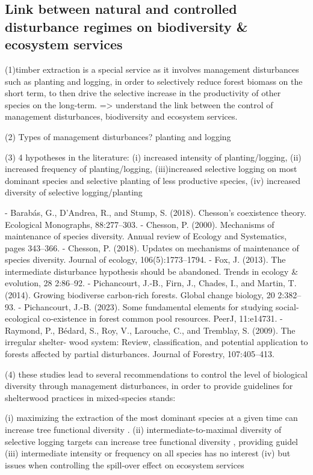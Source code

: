 \documentclass{article}
\begin{document}
\subsection{Link between natural and controlled disturbance regimes on biodiversity & ecosystem services}

(1)timber extraction is a special service as it involves management disturbances such as planting and logging, in order to selectively reduce forest biomass on the short term, to then drive the selective increase in the productivity of other species on the long-term. => understand the link between the control of management disturbances, biodiversity and ecosystem services.

(2) Types of management disturbances? planting and logging

(3) 4 hypotheses in the literature: (i) increased intensity of planting/logging, (ii) increased frequency of planting/logging, (iii)increased selective logging on most dominant species and selective planting of less productive species, (iv) increased diversity of selective logging/planting

- Barabás, G., D’Andrea, R., and Stump, S. (2018). Chesson’s coexistence theory. Ecological
Monographs, 88:277–303.
- Chesson, P. (2000). Mechanisms of maintenance of species diversity. Annual review of Ecology
and Systematics, pages 343–366.
- Chesson, P. (2018). Updates on mechanisms of maintenance of species diversity. Journal of
ecology, 106(5):1773–1794.
- Fox, J. (2013). The intermediate disturbance hypothesis should be abandoned. Trends in ecology
& evolution, 28 2:86–92.
- Pichancourt, J.-B., Firn, J., Chades, I., and Martin, T. (2014). Growing biodiverse carbon-rich
forests. Global change biology, 20 2:382–93.
- Pichancourt, J.-B. (2023). Some fundamental elements for studying social-ecological co-existence
in forest common pool resources. PeerJ, 11:e14731.
- Raymond, P., Bédard, S., Roy, V., Larouche, C., and Tremblay, S. (2009). The irregular shelter-
wood system: Review, classification, and potential application to forests affected by partial
disturbances. Journal of Forestry, 107:405–413.

(4) these studies lead to several recommendations to control the level of biological diversity through management disturbances, in order to provide guidelines for shelterwood practices in mixed-species stands: 

(i) maximizing the extraction of the most dominant species at a given time can increase tree functional diversity \citep{Pichancourt2014}.
(ii) intermediate-to-maximal diversity of selective logging targets can increase tree functional diversity  \citep{Pichancourt2023}, providing guidel
(iii) intermediate intensity or frequency on all species has no interest \citep{Chesson2000, Fox2013, Barabas2018}
(iv) but issues when controlling the spill-over effect on ecosystem services \citep{Raymond2009, Pichancourt2014, Pichancourt2023}
\end{document}
